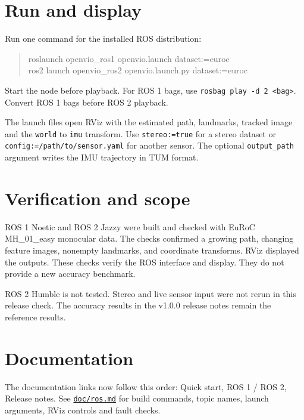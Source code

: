 \documentclass[10pt,a4paper]{article}
\begin{document}
\section{Run and display}
Run one command for the installed ROS distribution:
\begin{quote}\small\ttfamily
roslaunch openvio\_ros1 openvio.launch dataset:=euroc\\
ros2 launch openvio\_ros2 openvio.launch.py dataset:=euroc
\end{quote}
Start the node before playback. For ROS 1 bags, use \texttt{rosbag play -d 2 <bag>}.
Convert ROS 1 bags before ROS 2 playback.

The launch files open RViz with the estimated path, landmarks, tracked image and the \texttt{world} to \texttt{imu}
transform. Use \texttt{stereo:=true} for a stereo dataset or \texttt{config:=/path/to/sensor.yaml} for another sensor.
The optional \texttt{output\_path} argument writes the IMU trajectory in TUM format.

\section{Verification and scope}
ROS 1 Noetic and ROS 2 Jazzy were built and checked with EuRoC MH\_01\_easy monocular data. The checks confirmed a
growing path, changing feature images, nonempty landmarks, and coordinate transforms. RViz displayed the outputs.
These checks verify the ROS interface and display. They do not provide a new accuracy benchmark.

ROS 2 Humble is not tested. Stereo and live sensor input were not rerun in this release check. The accuracy results
in the v1.0.0 release notes remain the reference results.

\section{Documentation}
The documentation links now follow this order: Quick start, ROS 1 / ROS 2, Release notes. See
\href{https://github.com/93won/openvio/blob/master/doc/ros.md}{\texttt{doc/ros.md}} for build commands, topic names,
launch arguments, RViz controls and fault checks.
\end{document}
